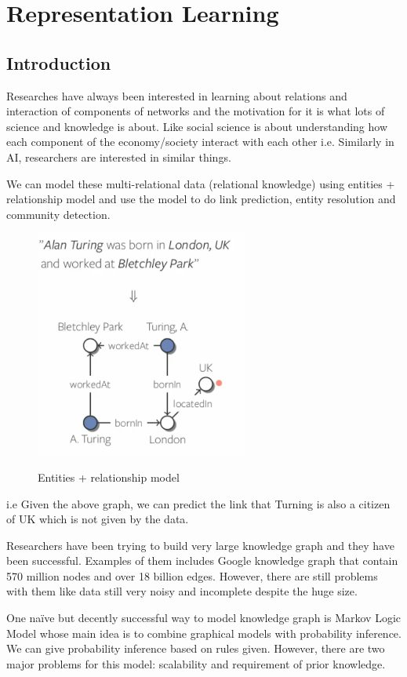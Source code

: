 \chapter{Representation Learning}

\section{Introduction}

Researches have always been interested in learning about relations and interaction of components of networks and the motivation for it is what lots of science and knowledge is about. Like social science is about understanding how each component of the economy/society interact with each other i.e. Similarly in AI, researchers are interested in similar things. 

We can model these multi-relational data (relational knowledge) using entities + relationship model and use the model to do link prediction, entity resolution and community detection. 
\begin{figure}[htb!]
\centering
\includegraphics[width=0.5\linewidth]{lectures/11-a/slides2.PNG}
\label{fig:tag_overlap}
\caption{Entities + relationship model}
\end{figure}
i.e Given the above graph, we can predict the link that Turning is also a citizen of UK which is not given by the data.

Researchers have been trying to build very large knowledge graph and they have been successful. Examples of them includes Google knowledge graph that contain 570 million nodes and over 18 billion edges. However, there are still problems with them like data still very noisy and incomplete despite the huge size.

One naïve but decently successful way to model knowledge graph is Markov Logic Model whose main idea is to combine graphical models with probability inference. We can give probability inference based on rules given. However, there are two major problems for this model: scalability and requirement of prior knowledge.

